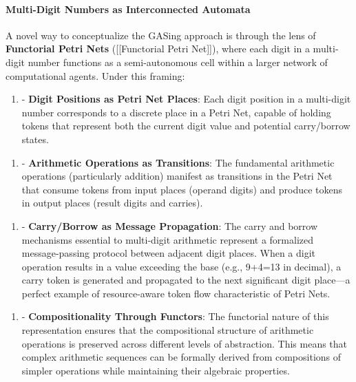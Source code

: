 \paragraph{Multi-Digit Numbers as Interconnected Automata}
A novel way to conceptualize the GASing approach is through the lens of \textbf{Functorial Petri Nets} ([[Functorial Petri Net]]), where each digit in a multi-digit number functions as a semi-autonomous cell within a larger network of computational agents. Under this framing:

\begin{enumerate}
  \item - \textbf{Digit Positions as Petri Net Places}: Each digit position in a multi-digit number corresponds to a discrete place in a Petri Net, capable of holding tokens that represent both the current digit value and potential carry/borrow states.
\end{enumerate}

\begin{enumerate}
  \item - \textbf{Arithmetic Operations as Transitions}: The fundamental arithmetic operations (particularly addition) manifest as transitions in the Petri Net that consume tokens from input places (operand digits) and produce tokens in output places (result digits and carries).
\end{enumerate}

\begin{enumerate}
  \item - \textbf{Carry/Borrow as Message Propagation}: The carry and borrow mechanisms essential to multi-digit arithmetic represent a formalized message-passing protocol between adjacent digit places. When a digit operation results in a value exceeding the base (e.g., 9+4=13 in decimal), a carry token is generated and propagated to the next significant digit place—a perfect example of resource-aware token flow characteristic of Petri Nets.
\end{enumerate}

\begin{enumerate}
  \item - \textbf{Compositionality Through Functors}: The functorial nature of this representation ensures that the compositional structure of arithmetic operations is preserved across different levels of abstraction. This means that complex arithmetic sequences can be formally derived from compositions of simpler operations while maintaining their algebraic properties.
\end{enumerate}

